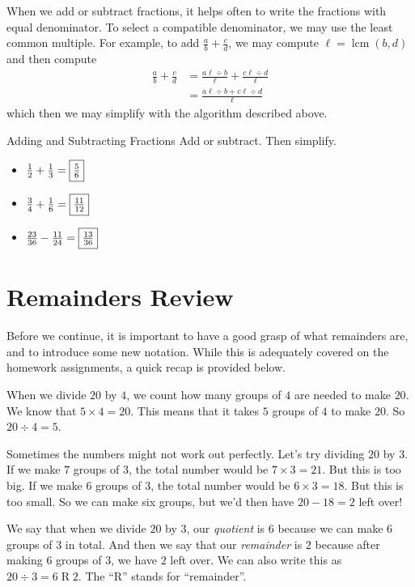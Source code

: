 \documentclass[a4paper,10pt]{report}
\begin{document}
When we add or subtract fractions, it helps often to write the fractions with
equal denominator. To select a compatible denominator, we may use the least
common multiple. For example, to add $\frac{a}{b}+\frac{c}{d}$, we may compute
$\ell=\operatorname{lcm}(b, d)$ and then compute \begin{align*}
 \frac{a}{b}+\frac{c}{d}
 &= \frac{a\ell\div b}{\ell} + \frac{c\ell\div d}{\ell} \\
 &= \frac{a\ell\div b + c\ell\div d}{\ell}
\end{align*} which then we may simplify with the algorithm described above.

\begin{problem}{Adding and Subtracting Fractions}
 Add or subtract. Then simplify.

 \begin{itemize}
  \item $\frac{1}{2} + \frac{1}{3} = \Ans{\frac{5}{6}}$
  \item $\frac{3}{4} + \frac{1}{6} = \Ans{\frac{11}{12}}$
  \item $\frac{23}{36} - \frac{11}{24} = \Ans{\frac{13}{36}}$
 \end{itemize}
\end{problem}

\section{Remainders Review}
Before we continue, it is important to have a good grasp of what remainders are,
and to introduce some new notation. While this is adequately covered on the
homework assignments, a quick recap is provided below.

When we divide $20$ by $4$, we count how many groups of $4$ are needed to make
$20$. We know that $5 \times 4 = 20$. This means that it takes $5$ groups of $4$
to make $20$. So $20 \div 4 = 5$.

Sometimes the numbers might not work out perfectly. Let's try dividing $20$ by
$3$. If we make $7$ groups of $3$, the total number would be $7 \times 3 = 21$.
But this is too big. If we make $6$ groups of $3$, the total number would be $6
\times 3 = 18$. But this is too small. So we can make six groups, but we'd then
have $20 - 18 = 2$ left over!

We say that when we divide $20$ by $3$, our \emph{quotient} is $6$ because we
can make $6$ groups of $3$ in total. And then we say that our \emph{remainder}
is $2$ because after making $6$ groups of $3$, we have $2$ left over. We can
also write this as $20 \div 3 = 6 \operatorname{R} 2$. The ``R'' stands for
``remainder''.
\end{document}
